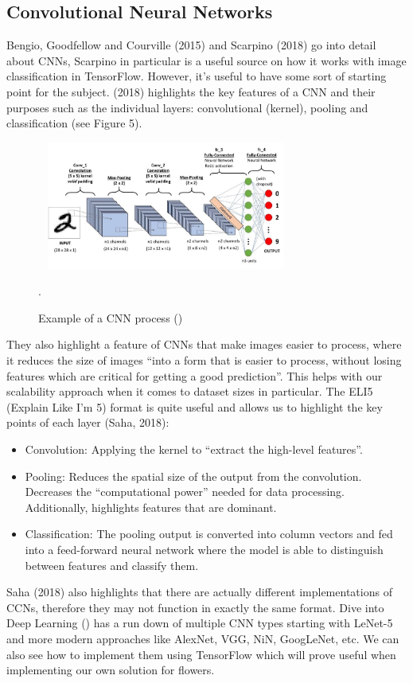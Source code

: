 \documentclass{article}
\begin{document}
\subsection{Convolutional Neural Networks}
Bengio, Goodfellow and Courville (2015) and Scarpino (2018) go into detail about CNNs, Scarpino in particular is a
useful source on how it works with image classification in TensorFlow. However, it’s useful to have 
some sort of starting point for the subject. \citeauthor{saha2018} (2018) highlights the key features of a CNN and their purposes such 
as the individual layers: convolutional (kernel),  pooling and classification (see Figure 5).
\newpage
\begin{figure}[h]\
    \centering
    \includegraphics[width=0.7\textwidth]{saha.jpg}
    \caption{Example of a CNN process (\cite{saha2018})}.
\end{figure}
They also highlight a feature of CNNs that make images easier to process, where it reduces the size of images “into a 
form that is easier to process, without losing features which are critical for getting a good prediction”. This helps 
with our scalability approach when it comes to dataset sizes in particular. The ELI5 (Explain Like I’m 5) format is 
quite useful and allows us to highlight the key points of each layer (Saha, 2018):
\begin{itemize}
    \item Convolution: Applying the kernel to “extract the high-level features”.
    \item Pooling: Reduces the spatial size of the output from the convolution. Decreases the “computational power” 
    needed for data processing. Additionally, highlights features that are dominant.
    \item Classification: The pooling output is converted into column vectors and fed into a feed-forward neural 
    network where the model is able to distinguish between features and classify them.
\end{itemize}
Saha (2018) also highlights that there are actually different implementations of CCNs, therefore they may not function 
in exactly the same format. Dive into Deep Learning (\cite{diveintodeeplearning}) has a run down of multiple CNN types starting with LeNet-5 
and more modern approaches like AlexNet, VGG, NiN, GoogLeNet, etc. We can also see how to implement them using 
TensorFlow which will prove useful when implementing our own solution for flowers.
\end{document}

